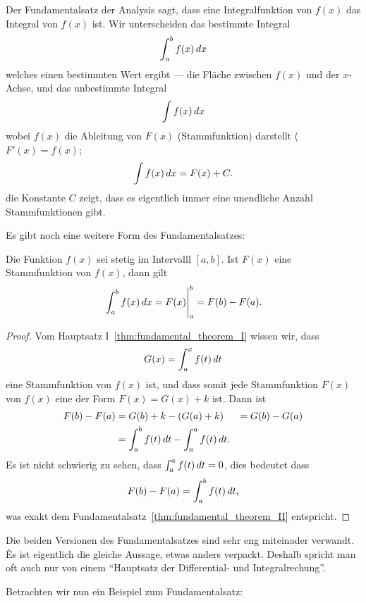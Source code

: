 Der Fundamentalsatz der Analysis sagt, dass eine Integralfunktion von $f(x)$ das Integral von $f(x)$ ist. Wir unterscheiden das bestimmte Integral
\[
  \int_a^b f(x)\, d x
\] 
welches einen bestimmten Wert ergibt --- die Fläche zwischen $f(x)$ und der $x$-Achse, und das unbestimmte Integral
\[
  \int f(x)\, d x
\]
wobei $f(x)$ die Ableitung von $F(x)$ (Stammfunktion) darstellt ($F'(x) = f(x)$;
\[
  \int f(x)\, d x = F(x)+C.
\]
die Konstante $C$ zeigt, dass es eigentlich immer eine unendliche Anzahl Stammfunktionen gibt.

Es gibt noch eine weitere Form des Fundamentalsatzes:

\begin{mainTheorem}
\label{thm:fundamental_theorem_II}\hfil

\noindent Die Funktion $f(x)$ sei stetig im Intervalll $[a,b]$. Ist $F(x)$
eine Stammfunktion von $f(x)$, dann gilt
\[
  \left.\int_a^b f(x)\, d x = F(x) \right|_a^b = F(b)-F(a).
\]
\end{mainTheorem}

\begin{proof}
Vom Hauptsatz I~\ref{thm:fundamental_theorem_I} wissen wir, dass
\[
  G(x)=\int_a^x f(t)\, d t
\]
eine Stammfunktion von $f(x)$ ist, und dass somit jede Stammfunktion
$F(x)$ von $f(x)$ eine der Form  $F(x)=G(x)+k$ ist. Dann ist 
\begin{align*}
  F(b)-F(a) &=G(b)+k-(G(a)+k) 
  &= G(b)-G(a) \\
  &=\int_a^b f(t)\, d t-\int_a^a f(t)\, d t.
\end{align*}
Es ist nicht schwierig zu sehen, dass $\int_a^a f(t)\, d t=0$, dies bedeutet dass
\[
  F(b)-F(a)=\int_a^b f(t)\, d t,
\]
was exakt dem Fundamentalsatz~\ref{thm:fundamental_theorem_II} entspricht.
\end{proof}

Die beiden Versionen des Fundamentalsatzes sind sehr eng miteinader verwandt. Ês ist eigentlich die gleiche Aussage, etwas anders verpackt. Deshalb spricht man oft auch nur von einem ``Hauptsatz der Differential- und Integralrechung''. 

Betrachten wir nun ein Beispiel zum Fundamentalsatz:


